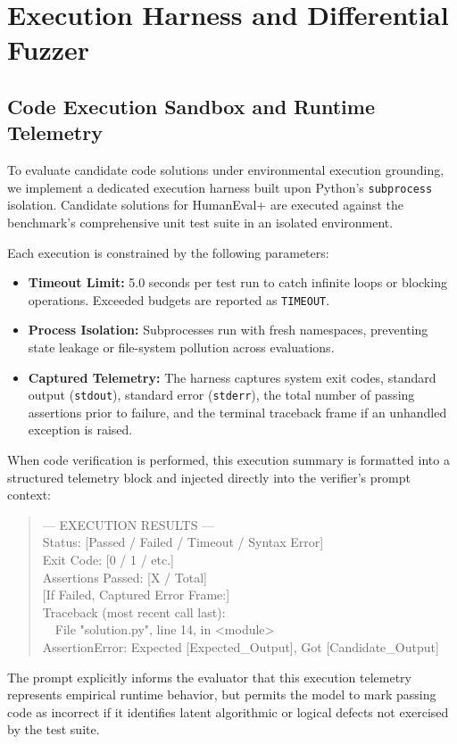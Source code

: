 
\section{Execution Harness and Differential Fuzzer}
\label{app:execution}

\subsection{Code Execution Sandbox and Runtime Telemetry}
To evaluate candidate code solutions under environmental execution grounding, we implement a dedicated execution harness built upon Python's \texttt{subprocess} isolation. Candidate solutions for HumanEval+ are executed against the benchmark's comprehensive unit test suite in an isolated environment.

Each execution is constrained by the following parameters:
\begin{itemize}[nosep, leftmargin=*]
  \item \textbf{Timeout Limit:} 5.0 seconds per test run to catch infinite loops or blocking operations. Exceeded budgets are reported as \texttt{TIMEOUT}.
  \item \textbf{Process Isolation:} Subprocesses run with fresh namespaces, preventing state leakage or file-system pollution across evaluations.
  \item \textbf{Captured Telemetry:} The harness captures system exit codes, standard output (\texttt{stdout}), standard error (\texttt{stderr}), the total number of passing assertions prior to failure, and the terminal traceback frame if an unhandled exception is raised.
\end{itemize}

When code verification is performed, this execution summary is formatted into a structured telemetry block and injected directly into the verifier's prompt context:
\begin{quote}
\small\ttfamily
--- EXECUTION RESULTS ---\\
Status: [Passed / Failed / Timeout / Syntax Error]\\
Exit Code: [0 / 1 / etc.]\\
Assertions Passed: [X / Total]\\[3pt]
{[}If Failed, Captured Error Frame:{]}\\
Traceback (most recent call last):\\
\ \ File "solution.py", line 14, in <module>\\
AssertionError: Expected [Expected\_Output], Got [Candidate\_Output]
\end{quote}
The prompt explicitly informs the evaluator that this execution telemetry represents empirical runtime behavior, but permits the model to mark passing code as incorrect if it identifies latent algorithmic or logical defects not exercised by the test suite.

